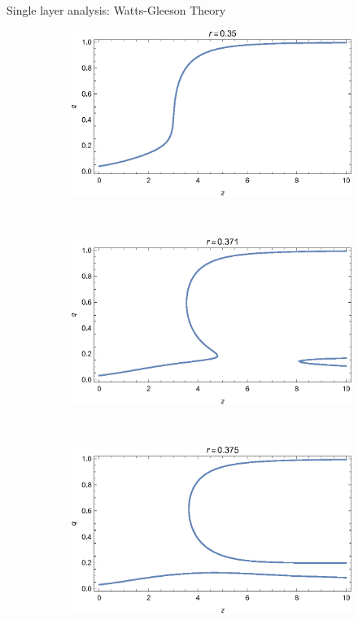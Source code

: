 \documentclass[10pt, xcolor=dvipsnames, handout]{beamer}
\begin{document}
\begin{frame}{Single layer analysis: Watts-Gleeson Theory}
\begin{figure}
    \centering
    \begin{subfigure}[b]{0.4\textwidth}
        \includegraphics[width=\textwidth]{figures/one_layer_qz_r035}
    \end{subfigure}
    ~ %
    \begin{subfigure}[b]{0.4\textwidth}
        \includegraphics[width=\textwidth]{figures/one_layer_qz_r0371}
    \end{subfigure}
    ~ %
    \begin{subfigure}[b]{0.4\textwidth}
        \includegraphics[width=\textwidth]{figures/one_layer_qz_r0375}

\end{subfigure}
\end{figure}
\end{frame}
\end{document}
